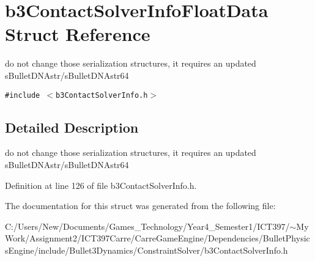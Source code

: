 \hypertarget{structb3_contact_solver_info_float_data}{
\section{b3ContactSolverInfoFloatData Struct Reference}
\label{structb3_contact_solver_info_float_data}
}
do not change those serialization structures, it requires an updated sBulletDNAstr/sBulletDNAstr64  


{\tt \#include $<$b3ContactSolverInfo.h$>$}



\subsection{Detailed Description}
do not change those serialization structures, it requires an updated sBulletDNAstr/sBulletDNAstr64 

Definition at line 126 of file b3ContactSolverInfo.h.

The documentation for this struct was generated from the following file:\begin{CompactItemize}
\item 
C:/Users/New/Documents/Games\_\-Technology/Year4\_\-Semester1/ICT397/$\sim$My Work/Assignment2/ICT397Carre/CarreGameEngine/Dependencies/BulletPhysicsEngine/include/Bullet3Dynamics/ConstraintSolver/b3ContactSolverInfo.h\end{CompactItemize}
